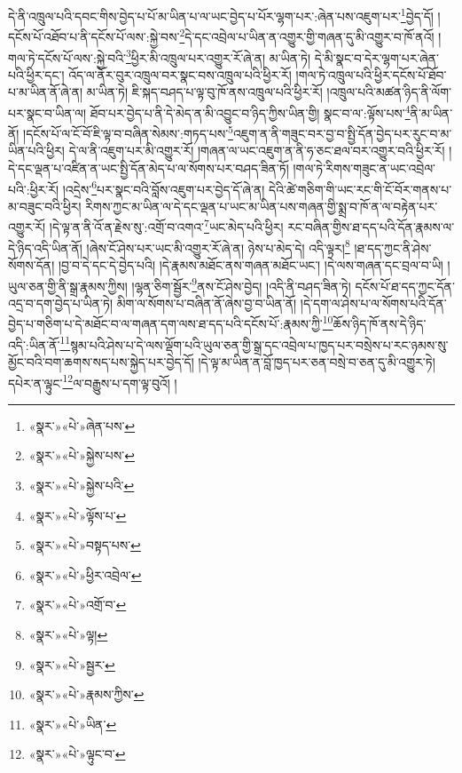 དེ་ནི་འཁྲུལ་པའི་དབང་གིས་བྱེད་པ་པོ་མ་ཡིན་པ་ལ་ཡང་བྱེད་པ་པོར་ལྷག་པར་:ཞེན་པས་འཇུག་པར་\footnote{«སྣར་»«པེ་»ཞེན་པས་}བྱེད་དོ། །དངོས་པོ་འཐོབ་པ་ནི་དངོས་པོ་ལས་:སྐྱེ་བས་\footnote{«སྣར་»«པེ་»སྐྱེས་པས་}དེ་དང་འབྲེལ་པ་ཡིན་ན་འགྱུར་གྱི་གཞན་དུ་མི་འགྱུར་བ་ཁོ་ནའོ། །གལ་ཏེ་དངོས་པོ་ལས་:སྐྱེ་བའི་\footnote{«སྣར་»«པེ་»སྐྱེས་པའི་}ཕྱིར་མི་འཁྲུལ་པར་འགྱུར་རོ་ཞེ་ན། མ་ཡིན་ཏེ། དེ་མི་སྣང་བ་དེར་ལྷག་པར་ཞེན་པའི་ཕྱིར་དང་། འོད་ལ་ནོར་བུར་འཁྲུལ་བར་སྣང་བས་འཁྲུལ་པའི་ཕྱིར་རོ། །གལ་ཏེ་འཁྲུལ་པའི་ཕྱིར་དངོས་པོ་ཐོབ་པ་མ་ཡིན་ནོ་ཞེ་ན། མ་ཡིན་ཏེ། ཇི་སྐད་བཤད་པ་ལྟ་བུ་ཁོ་ནས་འཁྲུལ་པའི་ཕྱིར་རོ། །འཁྲུལ་པའི་མཚན་ཉིད་ནི་ལོག་པར་སྣང་བ་ཡིན་ལ། ཐོབ་པར་བྱེད་པ་ནི་དེ་མེད་ན་མི་འབྱུང་བ་ཉིད་ཀྱིས་ཡིན་གྱི། སྣང་བ་ལ་:ལྟོས་པས་\footnote{«སྣར་»«པེ་»ལྟོས་པ་}ནི་མ་ཡིན་ནོ། །དངོས་པོ་ལ་ངོ་བོ་ཇི་ལྟ་བ་བཞིན་སེམས་:གཏད་པས་\footnote{«སྣར་»«པེ་»བསྟད་པས་}འཇུག་ན་ནི་གཟུང་བར་བྱ་བ་སྤྱི་དོན་བྱེད་པར་རུང་བ་མ་ཡིན་པའི་ཕྱིར། དེ་ལ་ནི་འཇུག་པར་མི་འགྱུར་རོ། །གཞན་ལ་ཡང་འཇུག་ན་ནི་ཧ་ཅང་ཐལ་བར་འགྱུར་བའི་ཕྱིར་རོ། །དེ་དང་ལྡན་པ་འཛིན་ན་ཡང་སྤྱི་དོན་མེད་པ་ལ་སོགས་པར་བཤད་ཟིན་ཏོ། །གལ་ཏེ་རིགས་གཟུང་ན་ཡང་འབྲེལ་པའི་:ཕྱིར་རོ། །འདྲེས་\footnote{«སྣར་»«པེ་»ཕྱིར་འབྲེལ་}པར་སྣང་བའི་བློས་འཇུག་པར་བྱེད་དོ་ཞེ་ན། དེའི་ཚེ་གཅིག་གི་ཡང་རང་གི་ངོ་བོར་གནས་པ་མ་བཟུང་བའི་ཕྱིར། རིགས་ཀྱང་མ་ཡིན་ལ་དེ་དང་ལྡན་པ་ཡང་མ་ཡིན་པས་གཞན་གྱི་སྨྲ་བ་ཁོ་ན་ལ་བརྟེན་པར་འགྱུར་རོ། །དེ་ལྟ་ན་ནི་འོ་ན་རྗེས་སུ་:འགྲོ་བ་འགའ་\footnote{«སྣར་»«པེ་»འགྲོ་བ་}ཡང་མེད་པའི་ཕྱིར། རང་བཞིན་གྱིས་ཐ་དད་པའི་དོན་རྣམས་ལ་དེ་ཉིད་འདི་ཡིན་ནོ། །ཞེས་ངོ་ཤེས་པར་ཡང་མི་འགྱུར་རོ་ཞེ་ན། ཉེས་པ་མེད་དེ། འདི་ལྟར།\footnote{«སྣར་»«པེ་»ལྟ།} །ཐ་དད་ཀྱང་ནི་ཤེས་སོགས་དོན། །བྱ་བ་དེ་དང་དེ་བྱེད་པའི། །དེ་རྣམས་མཐོང་ནས་གཞན་མཐོང་ཡང་། །དེ་ལས་གཞན་དང་བྲལ་བ་ཡི། །ཡུལ་ཅན་གྱི་ནི་སྒྲ་རྣམས་ཀྱིས། །ལྷན་ཅིག་སྦྱོར་\footnote{«སྣར་»«པེ་»སྦྱར་}ནས་ངོ་ཤེས་བྱེད། །འདི་ནི་བཤད་ཟིན་ཏེ། དངོས་པོ་ཐ་དད་ཀྱང་དོན་འདྲ་བ་དག་བྱེད་པ་ཡིན་ཏེ། མིག་ལ་སོགས་པ་བཞིན་ནོ་ཞེས་བྱ་བ་ཡིན་ནོ། །དེ་དག་ལ་ཤེས་པ་ལ་སོགས་པའི་དོན་བྱེད་པ་གཅིག་པ་དེ་མཐོང་བ་ལ་གཞན་དག་ལས་ཐ་དད་པའི་དངོས་པོ་:རྣམས་ཀྱི་\footnote{«སྣར་»«པེ་»རྣམས་ཀྱིས་}ཆོས་ཉིད་ཁོ་ནས་དེ་ཉིད་འདི་:ཡིན་ནོ་\footnote{«སྣར་»«པེ་»ཡིན་}སྙམ་པའི་ཤེས་པ་དེ་ལས་ལྡོག་པའི་ཡུལ་ཅན་གྱི་སྒྲ་དང་འབྲེལ་པ་ཁྱད་པར་བསྲེས་པ་རང་ཉམས་སུ་མྱོང་བའི་བག་ཆགས་སད་པས་སྐྱེད་པར་བྱེད་དོ། །དེ་ལྟ་མ་ཡིན་ན་བློ་ཁྱད་པར་ཅན་བསྲེ་བ་ཅན་དུ་མི་འགྱུར་ཏེ། དཔེར་ན་ལྟུང་\footnote{«སྣར་»«པེ་»ལྟུང་བ་}ལ་བརྒྱུས་པ་དག་ལྟ་བུའོ། །
